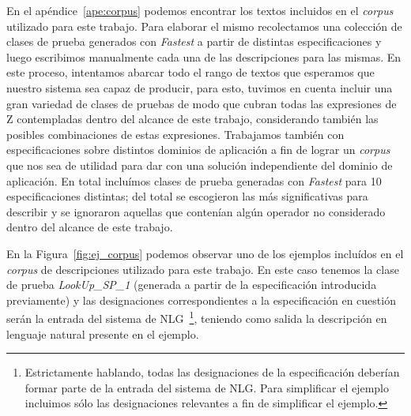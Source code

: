 En el apéndice~\ref{ape:corpus} podemos encontrar los textos incluidos en el \emph{corpus} utilizado para este trabajo. Para elaborar el mismo recolectamos una colección de clases de prueba generados con \emph{Fastest} a partir de distintas especificaciones y luego escribimos manualmente cada una de las descripciones para las mismas. En este proceso, intentamos abarcar todo el rango de textos que esperamos que nuestro sistema sea capaz de producir, para esto, tuvimos en cuenta incluir una gran variedad de clases de pruebas de modo que cubran todas las expresiones de Z contempladas dentro del alcance de este trabajo, considerando también las posibles combinaciones de estas expresiones. Trabajamos también con especificaciones sobre distintos dominios de aplicación a fin de lograr un \emph{corpus} que nos sea de utilidad para dar con una solución independiente del dominio de aplicación. En total incluímos clases de prueba generadas con \emph{Fastest} para 10 especificaciones distintas; del total se escogieron las más significativas para describir y se ignoraron aquellas que contenían algún operador no considerado dentro del alcance de este trabajo.


En la Figura~\ref{fig:ej_corpus} podemos observar uno de los ejemplos incluídos en el \emph{corpus} de descripciones utilizado para este trabajo. En este caso tenemos la clase de prueba \emph{LookUp\_SP\_1} (generada a partir de la especificación introducida previamente) y las designaciones correspondientes a la especificación en cuestión serán la entrada del sistema de NLG~\footnote{Estrictamente hablando, todas las designaciones de la especificación deberían formar parte de la entrada del sistema de NLG. Para simplificar el ejemplo incluimos sólo las designaciones relevantes a fin de simplificar el ejemplo.}, teniendo como salida la descripción en lenguaje natural presente en el ejemplo.

